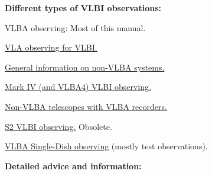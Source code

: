 \documentclass{report}
\begin{document}
{\bf Different types of VLBI observations:}

\begin{list}{}{\parsep 0em  \itemsep 0em }

\item VLBA observing:  Most of this manual.

\item 
{\hyperref[SEC:VLA]{VLA observing for VLBI.}}

\item 
{\hyperref[SEC:RECSYS]{General information on non-VLBA systems.}}

\item 
{\hyperref[SSEC:MKIV]{Mark IV (and VLBA4) VLBI observing.}}

\item 
{\hyperref[SSEC:FS9VLBA]{Non-VLBA telescopes with VLBA recorders.}}

\item 
{\hyperref[SSEC:S2]{S2 VLBI observing.}}  Obsolete.

\item 
{\hyperref[SEC:SPECIALVLBA]{VLBA Single-Dish observing}} (mostly
test observations).

\end{list}


{\bf Detailed advice and information:}
\end{document}
